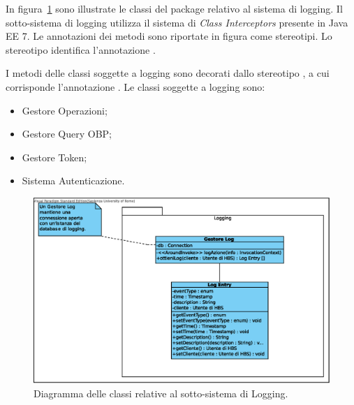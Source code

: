 In figura~\ref{fig:classi-principali:log} sono illustrate le classi del package relativo al sistema di logging.
Il sotto-sistema di logging utilizza il sistema di \emph{Class Interceptors} presente in Java EE 7.
Le annotazioni dei metodi sono riportate in figura come stereotipi.
Lo stereotipo  identifica l'annotazione .

I metodi delle classi soggette a logging sono decorati dallo stereotipo , a cui corrisponde l'annotazione .
Le classi soggette a logging sono:
\begin{itemize}
	\item Gestore Operazioni;
	\item Gestore Query OBP;
	\item Gestore Token;
	\item Sistema Autenticazione.
\end{itemize}

\begin{figure}[h]
    \centering
    \includegraphics[width=\textwidth]{Images/Logging.eps}
    \caption{Diagramma delle classi relative al sotto-sistema di Logging.}
    \label{fig:classi-principali:log}
\end{figure}

